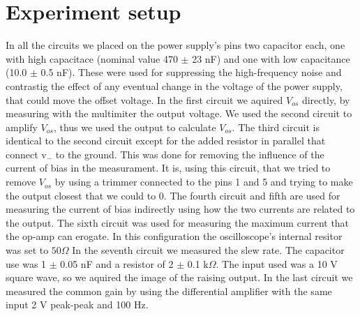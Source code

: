 \documentclass[oneside]{book}
\begin{document}
\section{Experiment setup}
In all the circuits we placed on the power supply's pins two capacitor each, one with high capacitace (nominal value 470 $\pm$ 23 nF) and one with low capacitance (10.0 $\pm$ 0.5 nF). These were used for suppressing the high-frequency noise and contrastig the effect of any eventual change in the voltage of the power supply, that could move the offset voltage.
In the first circuit we aquired $V_{os}$ directly, by measuring with the multimiter the output voltage.
We used the second circuit to amplify $V_{os}$, thus we used the output to calculate $V_{os}$.
The third circuit is identical to  the second circuit except for the added resistor in parallel that connect v$_-$ to the ground. This was done for removing the influence of the current of bias in the measurament. It is, using this circuit, that we tried to remove $V_{os}$ by using a trimmer connected to the pins 1 and 5 and trying to make the output closest that we could to 0.
The fourth circuit and fifth are used for measuring the current of bias indirectly using how the two currents are related to the output.
The sixth circuit was used for measuring the maximum current that the op-amp can erogate. In this configuration the oscilloscope's internal resitor was set to $50 \Omega$
In the seventh circuit we measured the slew rate. The capacitor use was 1 $\pm$ 0.05 nF and a resistor of 2 $\pm$ 0.1 k$\Omega$. The input used was a 10 V  square wave, so we aquired the image of the raising output.
In the last circuit we measured the common gain by using the differential amplifier with the same input 2 V peak-peak and 100 Hz.
\end{document}
